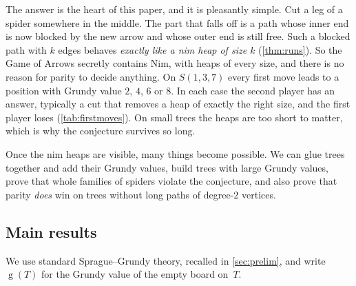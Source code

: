 \documentclass[11pt]{amsart}
\theoremstyle{definition}
\theoremstyle{remark}
\newcommand{\gv}{\operatorname{g}}           %
\newcommand{\Sp}{S}
\begin{document}
The answer is the heart of this paper, and it is pleasantly simple. Cut a leg of a spider somewhere in the middle. The part that falls off is a path whose inner end is now blocked by the new arrow and whose outer end is still free. Such a blocked path with $k$ edges behaves \emph{exactly like a nim heap of size $k$} (\cref{thm:runs}). So the Game of Arrows secretly contains Nim, with heaps of every size, and there is no reason for parity to decide anything. On $\Sp(1,3,7)$ every first move leads to a position with Grundy value $2$, $4$, $6$ or $8$. In each case the second player has an answer, typically a cut that removes a heap of exactly the right size, and the first player loses (\cref{tab:firstmoves}). On small trees the heaps are too short to matter, which is why the conjecture survives so long.

Once the nim heaps are visible, many things become possible. We can glue trees together and add their Grundy values, build trees with large Grundy values, prove that whole families of spiders violate the conjecture, and also prove that parity \emph{does} win on trees without long paths of degree-$2$ vertices.

\subsection*{Main results}
We use standard Sprague--Grundy theory, recalled in \cref{sec:prelim}, and write $\gv(T)$ for the Grundy value of the empty board on~$T$.
\end{document}
